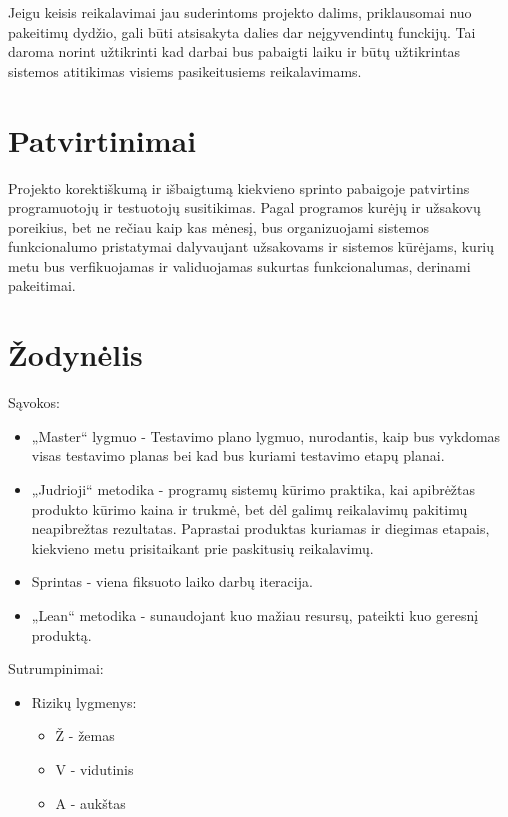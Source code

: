 \documentclass{VUMIFPSkursinis}
\begin{document}
    Jeigu keisis reikalavimai jau suderintoms projekto dalims, priklausomai nuo pakeitimų dydžio, gali būti atsisakyta dalies dar neįgyvendintų funckijų.
     Tai daroma norint užtikrinti kad darbai bus pabaigti laiku ir būtų užtikrintas sistemos atitikimas visiems pasikeitusiems reikalavimams.

    \section{Patvirtinimai}
    Projekto korektiškumą ir išbaigtumą kiekvieno sprinto pabaigoje patvirtins programuotojų ir testuotojų susitikimas. 
    Pagal programos kurėjų ir užsakovų poreikius, bet ne rečiau kaip kas mėnesį, bus organizuojami sistemos funkcionalumo pristatymai 
     dalyvaujant užsakovams ir sistemos kūrėjams, kurių metu bus verfikuojamas ir validuojamas sukurtas funkcionalumas, derinami pakeitimai.

    \section{Žodynėlis}

    Sąvokos:
    \begin{itemize}
	\item „Master“ lygmuo - Testavimo plano lygmuo, nurodantis, kaip bus vykdomas visas testavimo planas bei kad bus kuriami testavimo etapų planai.
      \item „Judrioji“ metodika - programų sistemų kūrimo praktika, kai apibrėžtas produkto kūrimo kaina ir trukmė, bet dėl galimų reikalavimų pakitimų neapibrežtas rezultatas.
       Paprastai produktas kuriamas ir diegimas etapais, kiekvieno metu prisitaikant prie paskitusių reikalavimų.
	  \item Sprintas - viena fiksuoto laiko darbų iteracija. 
	  \item „Lean“ metodika - sunaudojant kuo mažiau resursų, pateikti kuo geresnį produktą.
    \end{itemize}

    Sutrumpinimai:
    \begin{itemize}
    	\item Rizikų lygmenys:
    		\begin{itemize}
    			\item Ž - žemas
    			\item V - vidutinis
    			\item A - aukštas
    		\end{itemize}
    \end{itemize}

  
\end{document}
